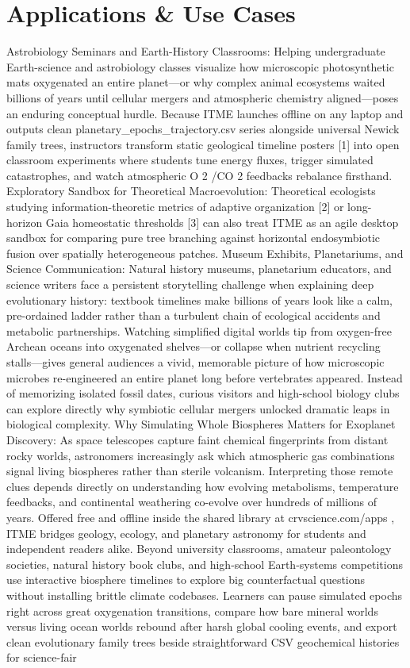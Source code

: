 \documentclass[10pt,letterpaper]{article}
\begin{document}
\section{Applications \& Use Cases}
Astrobiology Seminars and Earth-History Classrooms: Helping undergraduate Earth-science and astrobiology classes visualize how microscopic photosynthetic mats oxygenated an entire planet---or why complex animal ecosystems waited billions of years until cellular mergers and atmospheric chemistry aligned---poses an enduring conceptual hurdle. Because ITME launches offline on any laptop and outputs clean planetary\_epochs\_trajectory.csv series alongside universal Newick family trees, instructors transform static geological timeline posters [1] into open classroom experiments where students tune energy fluxes, trigger simulated catastrophes, and watch atmospheric O 2 /CO 2 feedbacks rebalance firsthand. Exploratory Sandbox for Theoretical Macroevolution: Theoretical ecologists studying information-theoretic metrics of adaptive organization [2] or long-horizon Gaia homeostatic thresholds [3] can also treat ITME as an agile desktop sandbox for comparing pure tree branching against horizontal endosymbiotic fusion over spatially heterogeneous patches. Museum Exhibits, Planetariums, and Science Communication: Natural history museums, planetarium educators, and science writers face a persistent storytelling challenge when explaining deep evolutionary history: textbook timelines make billions of years look like a calm, pre-ordained ladder rather than a turbulent chain of ecological accidents and metabolic partnerships. Watching simplified digital worlds tip from oxygen-free Archean oceans into oxygenated shelves---or collapse when nutrient recycling stalls---gives general audiences a vivid, memorable picture of how microscopic microbes re-engineered an entire planet long before vertebrates appeared. Instead of memorizing isolated fossil dates, curious visitors and high-school biology clubs can explore directly why symbiotic cellular mergers unlocked dramatic leaps in biological complexity. Why Simulating Whole Biospheres Matters for Exoplanet Discovery: As space telescopes capture faint chemical fingerprints from distant rocky worlds, astronomers increasingly ask which atmospheric gas combinations signal living biospheres rather than sterile volcanism. Interpreting those remote clues depends directly on understanding how evolving metabolisms, temperature feedbacks, and continental weathering co-evolve over hundreds of millions of years. Offered free and offline inside the shared library at crvscience.com/apps , ITME bridges geology, ecology, and planetary astronomy for students and independent readers alike. Beyond university classrooms, amateur paleontology societies, natural history book clubs, and high-school Earth-systems competitions use interactive biosphere timelines to explore big counterfactual questions without installing brittle climate codebases. Learners can pause simulated epochs right across great oxygenation transitions, compare how bare mineral worlds versus living ocean worlds rebound after harsh global cooling events, and export clean evolutionary family trees beside straightforward CSV geochemical histories for science-fair 
\end{document}

